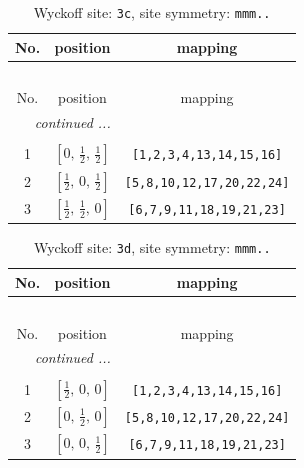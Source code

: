 \documentclass[fleqn,8pt]{jsarticle}
\begin{document}
\begin{longtable}{ccc}
\caption{Wyckoff site: {\tt 3c}, site symmetry: {\tt mmm..}}
 \\
 \hline \hline
No. & position & mapping \\ \hline \endfirsthead

\multicolumn{2}{l}{\tablename\ \thetable{}} \\
 \hline \hline
No. & position & mapping \\ \hline \endhead

 \hline \hline
\multicolumn{2}{r}{\footnotesize\it continued ...} \\ \endfoot

 \hline \hline
\multicolumn{2}{r}{} \\ \endlastfoot

1 & $\left[ 0,\, \frac{1}{2},\, \frac{1}{2} \right]$ & {\tt [1,2,3,4,13,14,15,16]} \\ \hline
2 & $\left[ \frac{1}{2},\, 0,\, \frac{1}{2} \right]$ & {\tt [5,8,10,12,17,20,22,24]} \\ \hline
3 & $\left[ \frac{1}{2},\, \frac{1}{2},\, 0 \right]$ & {\tt [6,7,9,11,18,19,21,23]} \\
\end{longtable}
\renewcommand{\arraystretch}{1.2}
\begin{longtable}{ccc}
\caption{Wyckoff site: {\tt 3d}, site symmetry: {\tt mmm..}}
 \\
 \hline \hline
No. & position & mapping \\ \hline \endfirsthead

\multicolumn{2}{l}{\tablename\ \thetable{}} \\
 \hline \hline
No. & position & mapping \\ \hline \endhead

 \hline \hline
\multicolumn{2}{r}{\footnotesize\it continued ...} \\ \endfoot

 \hline \hline
\multicolumn{2}{r}{} \\ \endlastfoot

1 & $\left[ \frac{1}{2},\, 0,\, 0 \right]$ & {\tt [1,2,3,4,13,14,15,16]} \\ \hline
2 & $\left[ 0,\, \frac{1}{2},\, 0 \right]$ & {\tt [5,8,10,12,17,20,22,24]} \\ \hline
3 & $\left[ 0,\, 0,\, \frac{1}{2} \right]$ & {\tt [6,7,9,11,18,19,21,23]} \\
\end{longtable}
\renewcommand{\arraystretch}{1.2}
\end{document}
